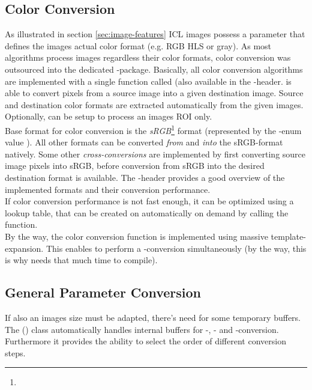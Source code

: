 \subsection{Color Conversion}

As illustrated in section \ref{sec:image-features} ICL images possess a  parameter that defines the images actual color format (e.g. RGB HLS or gray). As most algorithms process images regardless their color formats, color conversion was outsourced into the dedicated -package. Basically, all color conversion algorithms are implemented with a single function called  (also available in the -header.  is able to convert pixels from a source image into a given destination image. Source and destination color formats are extracted automatically from the given images. Optionally,  can be setup to process an images ROI only.\\
Base format for color conversion is the \emph{sRGB}\footnote{} format (represented by the -enum value ). All other formats can be converted \emph{from} and \emph{into} the sRGB-format natively. Some other \emph{cross-conversions} are implemented by first converting source image pixels into sRGB, before conversion from sRGB into the desired destination format is available. The -header provides a good overview of the implemented formats and their conversion performance.\\
If color conversion performance is not fast enough, it can be optimized using a lookup table, that can be created on automatically on demand by calling the  function.\\
By the way, the color conversion function  is implemented using massive template-expansion. This enables  to perform a -conversion simultaneously (by the way, this is why  needs that much time to compile).

\subsection{General Parameter Conversion}

If also an images size must be adapted, there's need for some temporary buffers. The  () class automatically handles internal buffers for -, - and -conversion. Furthermore it provides the ability to select the order of different conversion steps.
 

